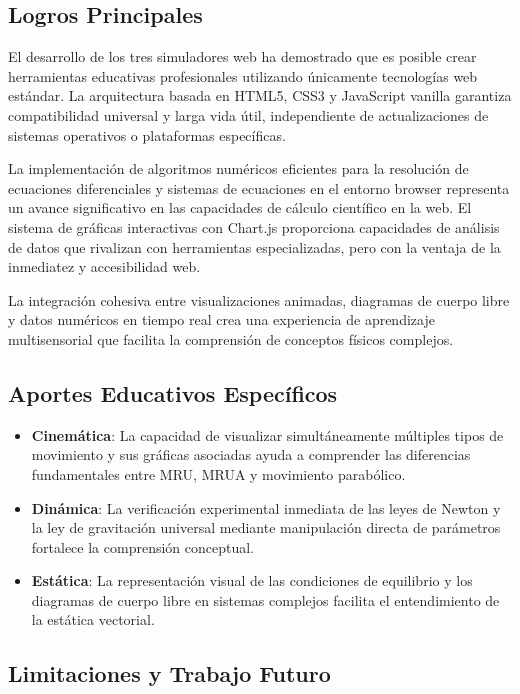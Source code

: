 \subsection{Logros Principales}

El desarrollo de los tres simuladores web ha demostrado que es posible crear herramientas educativas profesionales utilizando únicamente tecnologías web estándar. La arquitectura basada en HTML5, CSS3 y JavaScript vanilla garantiza compatibilidad universal y larga vida útil, independiente de actualizaciones de sistemas operativos o plataformas específicas.

La implementación de algoritmos numéricos eficientes para la resolución de ecuaciones diferenciales y sistemas de ecuaciones en el entorno browser representa un avance significativo en las capacidades de cálculo científico en la web. El sistema de gráficas interactivas con Chart.js proporciona capacidades de análisis de datos que rivalizan con herramientas especializadas, pero con la ventaja de la inmediatez y accesibilidad web.

La integración cohesiva entre visualizaciones animadas, diagramas de cuerpo libre y datos numéricos en tiempo real crea una experiencia de aprendizaje multisensorial que facilita la comprensión de conceptos físicos complejos.

\subsection{Aportes Educativos Específicos}

\begin{itemize}
    \item \textbf{Cinemática}: La capacidad de visualizar simultáneamente múltiples tipos de movimiento y sus gráficas asociadas ayuda a comprender las diferencias fundamentales entre MRU, MRUA y movimiento parabólico.
    
    \item \textbf{Dinámica}: La verificación experimental inmediata de las leyes de Newton y la ley de gravitación universal mediante manipulación directa de parámetros fortalece la comprensión conceptual.
    
    \item \textbf{Estática}: La representación visual de las condiciones de equilibrio y los diagramas de cuerpo libre en sistemas complejos facilita el entendimiento de la estática vectorial.
\end{itemize}

\subsection{Limitaciones y Trabajo Futuro}

